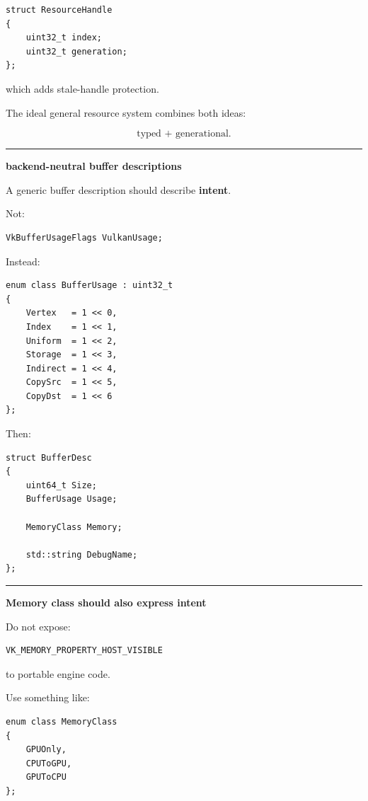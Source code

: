 \begin{verbatim}
struct ResourceHandle
{
    uint32_t index;
    uint32_t generation;
};
\end{verbatim}

which adds stale-handle protection.

The ideal general resource system combines both ideas:

\[
\boxed{
\text{typed + generational}.
}
\]

\begin{center}\rule{0.5\linewidth}{0.5pt}\end{center}

\textbf{backend-neutral buffer descriptions}

A generic buffer description should describe \textbf{intent}.

Not:

\begin{verbatim}
VkBufferUsageFlags VulkanUsage;
\end{verbatim}

Instead:

\begin{verbatim}
enum class BufferUsage : uint32_t
{
    Vertex   = 1 << 0,
    Index    = 1 << 1,
    Uniform  = 1 << 2,
    Storage  = 1 << 3,
    Indirect = 1 << 4,
    CopySrc  = 1 << 5,
    CopyDst  = 1 << 6
};
\end{verbatim}

Then:

\begin{verbatim}
struct BufferDesc
{
    uint64_t Size;
    BufferUsage Usage;

    MemoryClass Memory;

    std::string DebugName;
};
\end{verbatim}

\begin{center}\rule{0.5\linewidth}{0.5pt}\end{center}

\textbf{Memory class should also express intent}

Do not expose:

\begin{verbatim}
VK_MEMORY_PROPERTY_HOST_VISIBLE
\end{verbatim}

to portable engine code.

Use something like:

\begin{verbatim}
enum class MemoryClass
{
    GPUOnly,
    CPUToGPU,
    GPUToCPU
};
\end{verbatim}

